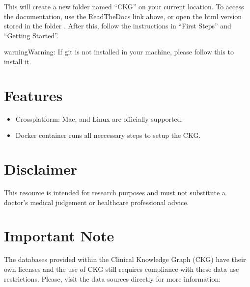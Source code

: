\documentclass[letterpaper,10pt,english]{sphinxmanual}
\begin{document}
This will create a new folder named “CKG” on your current location. To access the documentation, use the ReadTheDocs link above, or open the html version stored in the  folder . After this, follow the instructions in “First Steps” and “Getting Started”.

\begin{sphinxadmonition}{warning}{Warning:}
If git is not installed in your machine, please follow this  to install it.
\end{sphinxadmonition}


\section{Features}
\label{\detokenize{INTRO:features}}\begin{itemize}
\item {} 
Cross\sphinxhyphen{}platform: Mac, and Linux are officially supported.

\item {} 
Docker container runs all neccessary steps to setup the CKG.

\end{itemize}


\section{Disclaimer}
\label{\detokenize{INTRO:disclaimer}}
This resource is intended for research purposes and must not substitute a doctor’s medical judgement or healthcare professional advice.


\section{Important Note}
\label{\detokenize{INTRO:important-note}}
The databases provided within the Clinical Knowledge Graph (CKG) have their own licenses and the use of CKG still requires compliance with these data use restrictions. Please, visit the data sources directly for more information:
\end{document}
